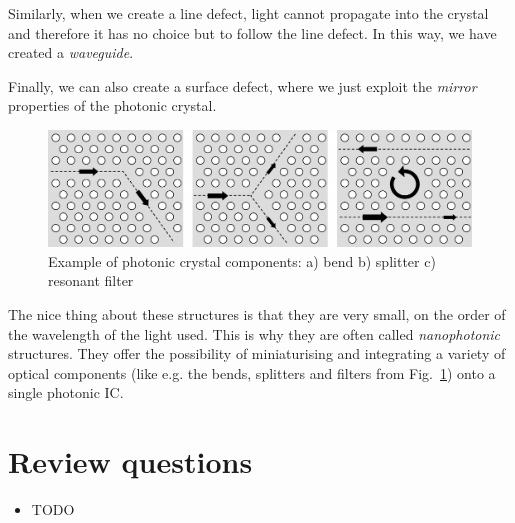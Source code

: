 Similarly, when we create a line defect, light cannot propagate into the crystal and therefore it has no choice but to follow the line defect. In this way, we have created a \emph{waveguide}.

Finally, we can also create a surface defect, where we just exploit the \emph{mirror} properties of the photonic crystal.

\begin{figure}
\centering
\includegraphics{symmetry/figures/2d_components}
\caption{Example of photonic crystal components: a) bend b) splitter c) resonant filter}
\label{fig-components}
\end{figure}

The nice thing about these structures is that they are very small, on the order of the wavelength of the light used. This is why they are often called \emph{nanophotonic} structures. They offer the possibility of miniaturising and integrating a variety of optical components (like e.g. the bends, splitters and filters from Fig.~\ref{fig-components}) onto a single photonic IC.


\section*{Review questions}

\begin{itemize}
\item TODO  
\end{itemize}

\pagebreak




